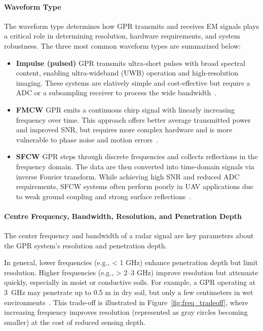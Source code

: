 \paragraph{Waveform Type}

The waveform type determines how \gls{GPR} transmits and receives \gls{EM} signals plays a critical role in determining resolution, hardware requirements, and system robustness. The three most common waveform types are summarized below:

\begin{itemize}
    \item \textbf{Impulse (pulsed)} \gls{GPR} transmits ultra-short pulses with broad spectral content, enabling ultra-wideband (UWB) operation and high-resolution imaging. These systems are elatively simple and cost-effective but require a \gls{ADC} or a subsampling receiver to process the wide bandwidth~\cite{chen2023ground,sipos2017drone}.

    \item \textbf{\gls{FMCW}} \gls{GPR} emits a continuous chirp signal with linearly increasing frequency over time. This approach offers better average transmitted power and improved \gls{SNR}, but requires more complex hardware and is more vulnerable to phase noise and motion errors~\cite{burr2018design}.
    
    \item \textbf{\gls{SFCW}} \gls{GPR} steps through discrete frequencies and collects reflections in the frequency domain. The data are then converted into time-domain signals via inverse Fourier transform. While achieving high \gls{SNR} and reduced \gls{ADC} requirements, \gls{SFCW} systems often perform poorly in \gls{UAV} applications due to weak ground coupling and strong surface reflections~\cite{tronca2018comparison}.
\end{itemize}


\paragraph{Centre Frequency, Bandwidth, Resolution, and Penetration Depth}

The center frequency and bandwidth of a radar signal are key parameters about the \gls{GPR} system’s resolution and penetration depth. 

In general, lower frequencies (e.g., < 1 GHz) enhance penetration depth but limit resolution. Higher frequencies (e.g., > 2--3 GHz) improve resolution but attenuate quickly, especially in moist or conductive soils. For example, a \gls{GPR} operating at 3~GHz may penetrate up to 0.5 m in dry soil, but only a few centimeters in wet environments~\cite{9758040}. This trade-off is illustrated in Figure~\ref{fig:freq_tradeoff}, where increasing frequency improves resolution (represented as gray circles becoming smaller) at the cost of reduced sensing depth.

